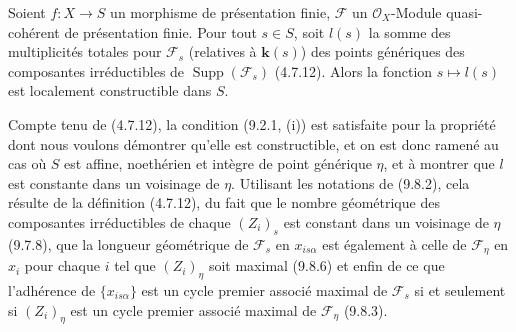 \begin{proposition}[9.8.8]
\label{IV.9.8.8-fr}
Soient $f:X\to S$ un morphisme de présentation finie, $\mathcal F$ un
$\mathcal O_X$-Module quasi-cohérent de présentation finie. Pour tout $s\in S$,
soit $l(s)$ la somme des multiplicités totales pour $\mathcal F_s$ (relatives à
$\boldsymbol{k}(s)$) des points génériques des composantes irréductibles de
$\operatorname{Supp}(\mathcal F_s)$ (4.7.12). Alors la fonction $s\mapsto l(s)$
est localement constructible dans $S$.
\end{proposition}

Compte tenu de (4.7.12), la condition (9.2.1, (i)) est satisfaite pour la
propriété dont nous voulons démontrer qu'elle est constructible, et on est donc
ramené au cas où $S$ est affine, noethérien et intègre de point générique
$\eta$, et à montrer que $l$ est constante dans un voisinage de $\eta$.
Utilisant les notations de (9.8.2), cela résulte de la définition (4.7.12), du
fait que le nombre géométrique des composantes irréductibles de chaque
$(Z_i)_s$ est constant dans un voisinage de $\eta$ (9.7.8), que la longueur
géométrique de $\mathcal F_s$ en $x_{is\alpha}$ est également à celle de
$\mathcal F_\eta$ en $x_i$ pour chaque $i$ tel que $(Z_i)_\eta$ soit maximal
(9.8.6) et enfin de ce que l'adhérence de $\{x_{is\alpha}\}$ est un cycle
premier associé maximal de $\mathcal F_s$ si et seulement si $(Z_i)_\eta$ est
un cycle premier associé maximal de $\mathcal F_\eta$ (9.8.3).

